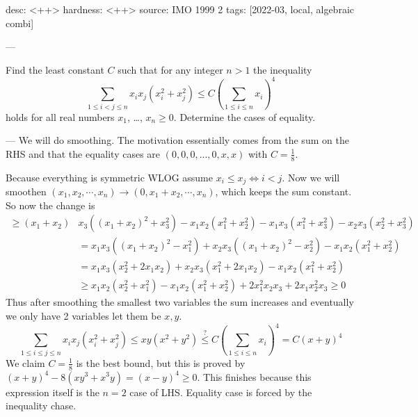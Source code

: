 desc: <++>
hardness: <++>
source: IMO 1999 2
tags: [2022-03, local, algebraic combi]

---

Find the least constant $C$ such that
for any integer $n > 1$ the inequality
\[\sum_{1 \le i < j \le n} x_i x_j (x_i^2 + x_j^2)
	\le C \left( \sum_{1 \le i \le n} x_i \right)^4\]
holds for all real numbers $x_1$, \dots, $x_n \ge 0$.
Determine the cases of equality.

---
We will do smoothing. The motivation essentially comes 
from the sum on the RHS and that the equality cases are
$(0,0,0,...,0,x,x)$ with $C = \frac{1}{8}$.

Because everything is symmetric WLOG assume $x_i \leq x_j \iff
i < j$. Now we will smoothen $(x_1,x_2,\cdots, x_n) \to (0,x_1+x_2,\cdots,x_n)$,
which keeps the sum constant. So now the change is
\begin{align*}
  \geq (x_1+x_2)&x_3((x_1+x_2)^2 + x_3^2) - x_1x_2(x_1^2+x_2^2) - 
  x_1x_3(x_1^2+x_3^2) - x_2x_3(x_2^2+x_3^2) \\
  &= x_1x_3((x_1+x_2)^2-x_1^2) + x_2x_3((x_1+x_2)^2-x_2^2) - x_1x_2(x_1^2+x_2^2) \\
  &= x_1x_3(x_2^2 + 2x_1x_2) + x_2x_3(x_1^2+2x_1x_2) - x_1x_2(x_1^2+x_2^2) \\
  &\geq x_1x_2(x_2^2 + x_1^2) - x_1x_2(x_1^2+x_2^2) + 2x_1^2x_2x_3 + 2x_1x_2^2x_3 \geq 0
\end{align*}
Thus after smoothing the smallest two variables the sum increases
and eventually we only have 2 variables let them be $x,y$. 
\[
  \sum_{1 \leq i \leq j \leq n} x_ix_j(x_i^2+x_j^2) \leq xy(x^2+y^2) \overset{?}{\leq} C \left(\sum_{1 \leq i \leq n} x_i\right)^4 = C (x+y)^4
\]
We claim $C = \frac{1}{8}$ is the best bound, but this is proved by
$(x+y)^4 - 8(xy^3+x^3y) = (x-y)^4 \geq 0$. This finishes because this expression
itself is the $n = 2$ case of LHS. Equality case is forced by the
inequality chase.
